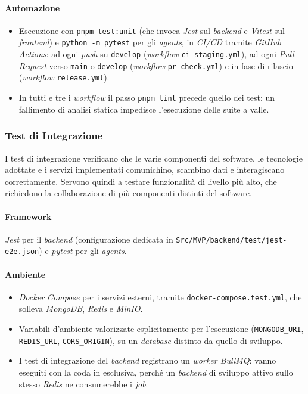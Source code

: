 \documentclass[12pt, a4paper]{article}
\begin{document}
\paragraph{Automazione}
\begin{itemize}
    \item Esecuzione con \texttt{pnpm test:unit} (che invoca \textit{Jest} sul \textit{backend} e \textit{Vitest} sul \textit{frontend}) e \texttt{python -m pytest} per gli \textit{agents}, in \textit{CI/CD} tramite \textit{GitHub Actions}: ad ogni \textit{push} su \texttt{develop} (\textit{workflow} \texttt{ci-staging.yml}), ad ogni \textit{Pull Request} verso \texttt{main} o \texttt{develop} (\textit{workflow} \texttt{pr-check.yml}) e in fase di rilascio (\textit{workflow} \texttt{release.yml}).
    \item In tutti e tre i \textit{workflow} il passo \texttt{pnpm lint} precede quello dei test: un fallimento di analisi statica impedisce l'esecuzione delle suite a valle.
\end{itemize}

\newpage
\subsubsection{Test di Integrazione}

I test di integrazione verificano che le varie componenti del software, le tecnologie adottate e i servizi implementati comunichino, scambino dati e interagiscano correttamente. Servono quindi a testare funzionalità di livello più alto, che richiedono la collaborazione di più componenti distinti del software.

\paragraph{Framework} \textit{Jest} per il \textit{backend} (configurazione dedicata in \texttt{Src/MVP/backend/test/jest-e2e.json}) e \textit{pytest} per gli \textit{agents}.

\paragraph{Ambiente}
\begin{itemize}
    \item \textit{Docker Compose} per i servizi esterni, tramite \texttt{docker-compose.test.yml}, che solleva \textit{MongoDB}, \textit{Redis} e \textit{MinIO}.
    \item Variabili d'ambiente valorizzate esplicitamente per l'esecuzione (\texttt{MONGODB\_URI}, \texttt{REDIS\_URL}, \texttt{CORS\_ORIGIN}), su un \textit{database} distinto da quello di sviluppo.
    \item I test di integrazione del \textit{backend} registrano un \textit{worker BullMQ}: vanno eseguiti con la coda in esclusiva, perché un \textit{backend} di sviluppo attivo sullo stesso \textit{Redis} ne consumerebbe i \textit{job}.
\end{itemize}
\end{document}
